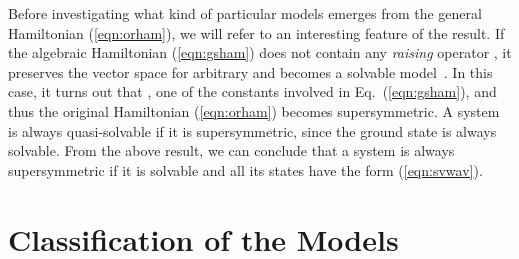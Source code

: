 \documentclass[a4paper,preprint,amsfonts,amssymb,amsmath,%
tightenlines,nofootinbib,noshowpacs]{revtex4}
\providecommand{\cN}{\mathcal{N}}
\providecommand{\cV}{\mathcal{V}}
\providecommand{\bC}{\boldsymbol{C}}
\begin{document}
Before investigating what kind of particular models emerges from
the general Hamiltonian (\ref{eqn:orham}), we will refer to
an interesting feature of the result. If the algebraic Hamiltonian
(\ref{eqn:gsham}) does not contain any \textit{raising} operator
\coordHE{}, it preserves the vector space \myHighlight{$\tilde{\cV}_{\cN}$}\coordHE{} for
arbitrary \myHighlight{$\cN$}\coordHE{} and becomes a solvable model~\cite{Turbi2,Ushve}.
In this case, it turns out that \myHighlight{$\bC(\sigma)=C$}\coordHE{}, one of the
constants involved in Eq.~(\ref{eqn:gsham}), and thus the
original Hamiltonian (\ref{eqn:orham}) becomes supersymmetric.
A system is always quasi-solvable if it is supersymmetric,
since the ground state is always solvable.
From the above result, we can conclude that a system is always
supersymmetric if it is solvable and all its states have the form
(\ref{eqn:svwav}).

\section{\label{sec:class}Classification of the Models}
\end{document}
